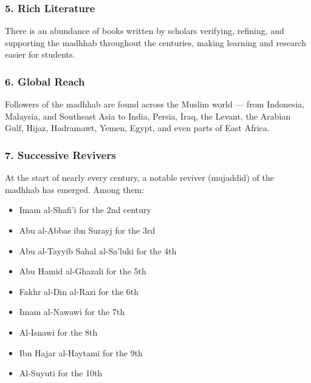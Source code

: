 \documentclass[
  a4paper,
  DIV=11,
  numbers=noendperiod]{scrartcl}
\providecommand{\tightlist}{%
  \setlength{\itemsep}{0pt}\setlength{\parskip}{0pt}}
\begin{document}
\subsubsection{5. Rich Literature}\label{rich-literature}

There is an abundance of books written by scholars verifying, refining,
and supporting the madhhab throughout the centuries, making learning and
research easier for students.

\subsubsection{6. Global Reach}\label{global-reach}

Followers of the madhhab are found across the Muslim world --- from
Indonesia, Malaysia, and Southeast Asia to India, Persia, Iraq, the
Levant, the Arabian Gulf, Hijaz, Hadramawt, Yemen, Egypt, and even parts
of East Africa.

\subsubsection{7. Successive Revivers}\label{successive-revivers}

At the start of nearly every century, a notable reviver (mujaddid) of
the madhhab has emerged. Among them:

\begin{itemize}
\tightlist
\item
  Imam al-Shafi'i for the 2nd century\\
\item
  Abu al-Abbas ibn Surayj for the 3rd\\
\item
  Abu al-Tayyib Sahal al-Sa'luki for the 4th\\
\item
  Abu Hamid al-Ghazali for the 5th\\
\item
  Fakhr al-Din al-Razi for the 6th\\
\item
  Imam al-Nawawi for the 7th\\
\item
  Al-Isnawi for the 8th\\
\item
  Ibn Hajar al-Haytami for the 9th\\
\item
  Al-Suyuti for the 10th
\end{itemize}
\end{document}
